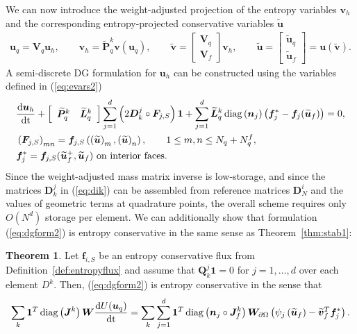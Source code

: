 \documentclass[preprint,10pt]{article}
\theoremstyle{definition}
\theoremstyle{lemma}
\theoremstyle{theorem}
\newtheorem{theorem}{Theorem}
\theoremstyle{assumption}
\DeclareMathOperator{\diag}{diag}
\renewcommand{\tilde}{\widetilde}
\newcommand{\td}[2]{\frac{{\rm d}#1}{{\rm d}{\rm #2}}}
\newcommand{\LRp}[1]{\left( #1 \right)}
\newcommand{\LRs}[1]{\left[ #1 \right]}
\begin{document}
{We can now introduce the weight-adjusted projection of the entropy variables $\bm{v}_h$ and the corresponding entropy-projected conservative variables $\tilde{\bm{u}}$ 
\begin{align}
\bm{u}_q = \bm{V}_q \bm{u}_h, \qquad \bm{v}_h = \tilde{\bm{P}}^k_q \bm{v}\LRp{\bm{u}_q}, \qquad 
\tilde{\bm{v}} = \LRs{\begin{array}{c}
\bm{V}_q\\
\bm{V}_f
\end{array}}\bm{v}_h, \qquad \tilde{\bm{u}} =  \LRs{\begin{array}{c}
\tilde{\bm{u}}_q\\
\tilde{\bm{u}}_f
\end{array}} = \bm{u}\LRp{\tilde{\bm{v}}}.
\label{eq:evars2}
\end{align}
A semi-discrete DG formulation for $\bm{u}_h$ can be constructed using the variables defined in (\ref{eq:evars2})
\begin{align}
&\td{\bm{u}_h}{t} + \LRs{\begin{array}{cc}\tilde{\bm{P}}^k_q & \tilde{\bm{L}}^k_q\end{array}}
  \sum_{j=1}^d \LRp{2\bm{D}^j_k \circ \bm{F}_{j,S}}\bm{1} + \sum_{j=1}^d \tilde{\bm{L}}^k_q \diag\LRp{\bm{n}_j}\LRp{\bm{f}_j^* - \bm{f}_j(\tilde{\bm{u}}_f)} = 0,\label{eq:dgform2}\\
  &\LRp{\bm{F}_{j,S}}_{mn} = \bm{f}_{j,S}\LRp{\LRp{\tilde{\bm{u}}}_m,\LRp{\tilde{\bm{u}}}_n}, \qquad 1 \leq m,n \leq N_q + N^f_q,\nonumber\\
  &\bm{f}_j^* = \bm{f}_{j,S}(\tilde{\bm{u}}_f^+,\tilde{\bm{u}}_f) \text{ on interior faces}.\nonumber
\end{align}
Since the  weight-adjusted mass matrix inverse is low-storage, and since the matrices $\bm{D}^j_k$ in (\ref{eq:dik}) can be assembled from reference matrices $\bm{D}^i_N$ and the values of geometric terms at quadrature points, the overall scheme requires only $O(N^d)$ storage per element.  We can additionally show that formulation (\ref{eq:dgform2}) is entropy conservative in the same sense as Theorem~\ref{thm:stab1}: 
\begin{theorem}
  Let $\bm{f}_{i,S}$ be an entropy conservative flux from Definition~\ref{def:entropyflux} and assume that $\bm{Q}^j_k\bm{1} = 0$ for $j = 1,\ldots,d$ over each element $D^k$.  Then, (\ref{eq:dgform2}) is entropy conservative in the sense that
\[
  \sum_k \bm{1}^T\diag\LRp{\bm{J}^k}\bm{W}\td{U(\bm{u}_q)}{t} = \sum_k \sum_{j=1}^d \bm{1}^T\diag\LRp{\bm{n}_j\circ\bm{J}^k_f}\bm{W}_{\partial \Omega} \LRp{\psi_j\LRp{\tilde{\bm{u}}_f}-\tilde{\bm{v}}_f^T\bm{f}_j^*}.
\]
\end{theorem}}
\end{document}
